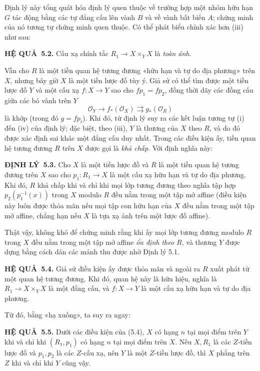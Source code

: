 \documentclass[11pt,twoside,openany]{book}
\numberwithin{equation}{section}
\newcommand{\src}[1]{%
  \phantomsection\hypertarget{src:\fgasourceid:#1}{}%
  \marginpar{\raggedleft\footnotesize\sffamily #1}%
}
\newcommand{\fgasourceid}{unset}
\newcommand{\result}[2]{\par\medskip\noindent\textbf{#1\if\relax\detokenize{#2}\relax\else\ #2\fi.}\quad}
\begin{document}
Định lý này tổng quát hóa định lý quen thuộc về trường hợp một nhóm hữu hạn
$G$ tác động bằng các tự đẳng cấu lên vành $B$ và về vành bất biến $A$; chứng
minh của nó tương tự chứng minh quen thuộc. Có thể phát biểu chính xác hơn
(iii) như sau:

\result{HỆ QUẢ}{5.2} Cấu xạ chính tắc
$R_1\to X\times_Y X$ là \emph{toàn ánh}.

Vẫn cho $R$ là một tiền quan hệ tương đương «hữu hạn và tự do địa phương»
trên $X$, nhưng bây giờ $X$ là một tiền lược đồ tùy ý. Giả sử có thể tìm được
một tiền lược đồ $Y$ và một cấu xạ $f:X\to Y$ sao cho $fp_1=fp_2$, đồng thời
dãy các đồng cấu giữa các bó vành trên $Y$
\[
  \mathcal O_Y\longrightarrow f_*(\mathcal O_X)
  \rightrightarrows g_*(\mathcal O_R)
\]
là khớp (trong đó $g=fp_i$). Khi đó, từ định lý suy ra các kết luận tương tự
(i) đến (iv) của định lý; đặc biệt, theo (iii), $Y$ là thương của $X$ theo
$R$, và do đó được xác định sai khác một đẳng cấu duy nhất. Trong các điều
kiện ấy, tiền quan hệ tương đương $R$ trên $X$ được gọi là \emph{khả chấp}.
Với định nghĩa này:

\result{ĐỊNH LÝ}{5.3} Cho $X$ là một tiền lược đồ và $R$ là một tiền quan hệ
tương đương trên $X$ sao cho $p_1:R_1\to X$ là một cấu xạ hữu hạn và tự do địa
phương. Khi đó, $R$ khả chấp khi và chỉ khi mọi lớp tương đương theo nghĩa tập
hợp $p_2(p_1^{-1}(x))$ trong $X$ modulo $R$ đều nằm trong một tập mở affine
(điều kiện này luôn được thỏa mãn nếu mọi tập con hữu hạn của $X$ đều nằm
trong một tập mở affine, chẳng hạn nếu $X$ là tựa xạ ảnh trên một lược đồ
affine).

Thật vậy, không khó để chứng minh rằng khi ấy mọi lớp tương đương modulo $R$
trong $X$ đều nằm trong một tập mở affine \emph{ổn định theo $R$}, và thương
$Y$ được dựng bằng cách dán các mảnh thu được nhờ Định lý 5.1.
\src{112}

\result{HỆ QUẢ}{5.4} Giả sử điều kiện ấy được thỏa mãn và ngoài ra $R$ xuất
phát từ một quan hệ tương đương. Khi đó, quan hệ này là hữu hiệu, nghĩa là
$R_1\to X\times_Y X$ là một đẳng cấu, và $f:X\to Y$ là một cấu xạ hữu hạn và
tự do địa phương.

Từ đó, bằng «hạ xuống», ta suy ra ngay:

\result{HỆ QUẢ}{5.5} Dưới các điều kiện của (5.4), $X$ có hạng $n$ tại mọi
điểm trên $Y$ khi và chỉ khi $(R_1,p_1)$ có hạng $n$ tại mọi điểm trên $X$.
Nếu $X,R_1$ là các $Z$-tiền lược đồ và $p_1,p_2$ là các $Z$-cấu xạ, nên $Y$
là một $Z$-tiền lược đồ, thì $X$ phẳng trên $Z$ khi và chỉ khi $Y$ cũng vậy.
\end{document}
